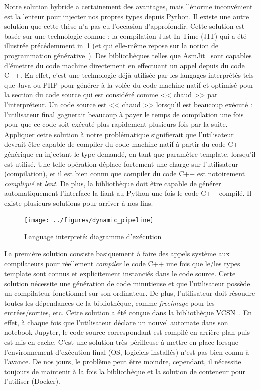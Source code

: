 Notre solution hybride a certainement des avantages, mais l'énorme inconvénient est la lenteur pour injecter nos propres
types depuis Python. Il existe une autre solution que cette thèse n'a pas eu l'occasion d'approfondir. Cette solution
est basée sur une technologie connue : la compilation Just-In-Time (JIT) qui a été illustrée précédemment
in~\cref{resume:fig:static.dynamic.dynamic.pipeline} (et qui elle-même repose sur la notion de programmation
générative~\parencite{czarnecki.2000.generative}). Des bibliothèques telles que AsmJit~\parencite{kobalicek.2011.asmjit}
sont capables d'émettre du code machine directement en effectuant un appel depuis du code C++. En effet, c'est une
technologie déjà utilisée par les langages interprétés tels que Java ou PHP pour générer à la volée du code machine
natif et optimisé pour la section du code source qui est considéré comme << chaud >> par l'interpréteur. Un code source
est << chaud >> lorsqu'il est beaucoup exécuté : l'utilisateur final gagnerait beaucoup à payer le temps de compilation
une fois pour que ce code soit exécuté plus rapidement plusieurs fois par la suite. Appliquer cette solution à notre
problématique signifierait que l'utilisateur devrait être capable de compiler du code machine natif à partir du code C++
générique en injectant le type demandé, en tant que paramètre template, lorsqu'il est utilisé. Une telle opération
déplace fortement une charge sur l'utilisateur (compilation), et il est bien connu que compiler du code C++ est
notoirement \emph{compliqué} et \emph{lent}. De plus, la bibliothèque doit être capable de générer automatiquement
l'interface la liant au Python une fois le code C++ compilé. Il existe plusieurs solutions pour arriver à nos fins.

\begin{figure}[htbp]
  \centering
  \texttt{[image: ../figures/dynamic\_pipeline]}
  \caption{Language interpreté: diagramme d'exécution}
  \label{resume:fig:static.dynamic.dynamic.pipeline}
\end{figure}

La première solution consiste basiquement à faire des appels système aux compilateurs pour réellement \emph{compiler} le
code C++ une fois que le/les types template sont connus et explicitement instanciés dans le code source. Cette solution
nécessite une génération de code minutieuse et que l'utilisateur possède un compilateur fonctionnel sur son ordinateur.
De plus, l'utilisateur doit résoudre toutes les dépendances de la bibliothèque, comme \emph{freeimage} pour les
entrées/sorties, etc. Cette solution a été conçue dans la bibliothèque VCSN~\parencite{demaille.2013.vcsn}. En effet, à
chaque fois que l'utilisateur déclare un nouvel automate dans son notebook Jupyter, le code source correspondant est
compilé en arrière-plan puis est mis en cache. C'est une solution très périlleuse à mettre en place lorsque
l'environnement d'exécution final (OS, logiciels installés) n'est pas bien connu à l'avance. De nos jours, le problème
peut être moindre, cependant, il nécessite toujours de maintenir à la fois la bibliothèque et la solution de conteneur
pour l'utiliser (Docker).

